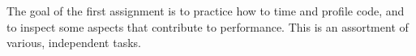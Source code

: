 The goal of the first assignment is to practice how to time and profile code, and to inspect some aspects that contribute to performance. This is an assortment of various, independent tasks.
